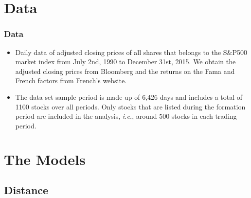 \documentclass[pdf,9pt,xcolor=dvipsnames,hide notes]{beamer}
\begin{document}
\section{Data}
\begin{frame}[label=frame2b]
	\frametitle{Data}
		\begin{itemize}
		\justifying
		
		\item 	Daily data of adjusted closing prices of all shares that belongs to the S\&P500 market index from July 2nd, 1990 to December 31st, 2015. We obtain the adjusted closing prices from Bloomberg and the returns on the Fama and French factors from French's website. 
		
		\vspace{0.3cm}
		
		\item The data set sample period is made up of 6,426 days and includes a total of 1100 stocks over all periods. Only stocks that are listed during the formation period are included in the analysis, \emph{i.e.}, around 500 stocks in each trading period.
		
	\end{itemize}
	
\end{frame}

\section{The Models}
\subsection{Distance}
\end{document}
